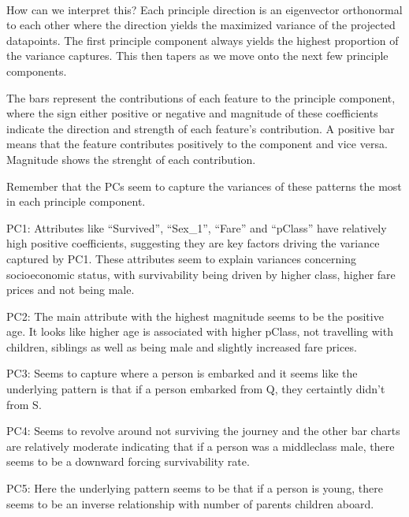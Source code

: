 \documentclass[11pt]{article}
\begin{document}
    \begin{center}
    \end{center}
    { \hspace*{\fill} \\}
    
    How can we interpret this? Each principle direction is an eigenvector
orthonormal to each other where the direction yields the maximized
variance of the projected datapoints. The first principle component
always yields the highest proportion of the variance captures. This then
tapers as we move onto the next few principle components.

The bars represent the contributions of each feature to the principle
component, where the sign either positive or negative and magnitude of
these coefficients indicate the direction and strength of each feature's
contribution. A positive bar means that the feature contributes
positively to the component and vice versa. Magnitude shows the strenght
of each contribution.

Remember that the PCs seem to capture the variances of these patterns
the most in each principle component.

PC1: Attributes like ``Survived'', ``Sex\_1'', ``Fare'' and ``pClass''
have relatively high positive coefficients, suggesting they are key
factors driving the variance captured by PC1. These attributes seem to
explain variances concerning socioeconomic status, with survivability
being driven by higher class, higher fare prices and not being male.

PC2: The main attribute with the highest magnitude seems to be the
positive age. It looks like higher age is associated with higher pClass,
not travelling with children, siblings as well as being male and
slightly increased fare prices.

PC3: Seems to capture where a person is embarked and it seems like the
underlying pattern is that if a person embarked from Q, they certaintly
didn't from S.

PC4: Seems to revolve around not surviving the journey and the other bar
charts are relatively moderate indicating that if a person was a
middleclass male, there seems to be a downward forcing survivability
rate.

PC5: Here the underlying pattern seems to be that if a person is young,
there seems to be an inverse relationship with number of parents
children aboard.
\end{document}
